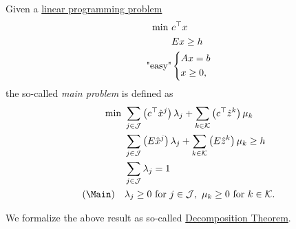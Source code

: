 \begin{definition}\label{def:main-problem}
	Given a \hyperref[def:general-linear-programming-problem]{linear programming problem}
	\[
		\begin{aligned}
			\min~         & c^{\top}x     \\
			              & Ex\geq h      \\
			\text{"easy"} & \begin{dcases}
				                Ax = b \\
				                x\geq 0,
			                \end{dcases}
		\end{aligned}
	\]
	the so-called \emph{main problem} is defined as
	\[
		\begin{aligned}
			\min~        & \sum\limits_{j\in\mathcal{J}}\left(c^{\top}\hat{x}^j\right)\lambda_{j} + \sum\limits_{k\in\mathcal{K}}\left(c^{\top} \hat{z}^k  \right)\mu_k \\
			             & \sum\limits_{j\in\mathcal{J}}\left(E\hat{x}^j\right)\lambda_{j} + \sum\limits_{k\in\mathcal{K}}\left(E \hat{z}^k \right)\mu_k \geq h         \\
			             & \sum\limits_{j\in\mathcal{J}}\lambda_{j} = 1                                                                                                 \\
			(\Main)\quad & \lambda_{j}\geq 0 \text{ for }j\in\mathcal{J},\ \mu_k\geq 0 \text{ for }k\in\mathcal{K}.
		\end{aligned}
	\]
\end{definition}

We formalize the above result as so-called \hyperref[thm:decomposition]{Decomposition Theorem}.

